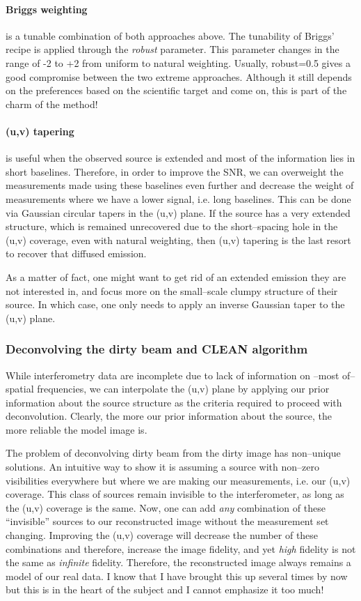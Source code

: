 \documentclass[paper=a4, fontsize=11pt]{scrartcl} %
\numberwithin{equation}{section} %
\numberwithin{figure}{section} %
\numberwithin{table}{section} %
\begin{document}
\paragraph*{Briggs weighting} is a tunable combination of both approaches above. The tunability of Briggs' recipe is applied through the \emph{robust} parameter. This parameter changes in the range of -2 to +2 from uniform to natural weighting. Usually, robust=0.5 gives a good compromise between the two extreme approaches. Although it still depends on the preferences based on the scientific target and come on, this is part of the charm of the method!

\paragraph*{(u,v) tapering} is useful when the observed source is extended and most of the information lies in short baselines. Therefore, in order to improve the SNR, we can overweight the measurements made using these baselines even further and decrease the weight of measurements where we have a lower signal, i.e. long baselines. This can be done via Gaussian circular tapers in the (u,v) plane. If the source has a very extended structure, which is remained unrecovered due to the short--spacing hole in the (u,v) coverage, even with natural weighting, then (u,v) tapering is the last resort to recover that diffused emission. 

As a matter of fact, one might want to get rid of an extended emission they are not interested in, and focus more on the small--scale clumpy structure of their source. In which case, one only needs to apply an inverse Gaussian taper to the (u,v) plane.

\subsubsection*{Deconvolving the dirty beam and CLEAN algorithm}
\label{sec:CLEAN}
While interferometry data are incomplete due to lack of information on --most of-- spatial frequencies, we can interpolate the (u,v) plane by applying our prior information about the source structure as the criteria required to proceed with deconvolution. Clearly, the more our prior information about the source, the more reliable the model image is.

The problem of deconvolving dirty beam from the dirty image has non--unique solutions. An intuitive way to show it is assuming a source with non--zero visibilities everywhere but where we are making our measurements, i.e. our (u,v) coverage. This class of sources remain invisible to the interferometer, as long as the (u,v) coverage is the same. Now, one can add \emph{any} combination of these ``invisible'' sources to our reconstructed image without the measurement set changing. Improving the (u,v) coverage will decrease the number of these combinations and therefore, increase the image fidelity, and yet \emph{high} fidelity is not the same as \emph{infinite} fidelity. Therefore, the reconstructed image always remains a model of our real data. I know that I have brought this up several times by now but this is in the heart of the subject and I cannot emphasize it too much!
\end{document}
